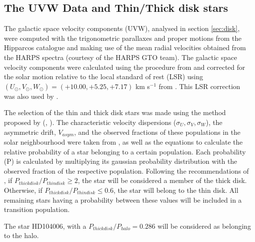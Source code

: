 \documentclass[oldversion]{aa}
\begin{document}
\subsection {The UVW Data and Thin/Thick disk stars}
\label{sec:uvwdata}

The galactic space velocity components (UVW), analysed in section \ref{sec:disk}, were computed with the trigonometric parallaxes and proper motions from the Hipparcos catalogue \citep{ESA-1997} and making use of the mean radial velocities obtained from the HARPS spectra (courtesy of the HARPS GTO team).  The galactic space velocity components were calculated using the procedure from \citet{Johnson-1987} and corrected for the solar motion relative to the local standard of rest (LSR) using $(U_\odot,V_\odot,W_\odot)=(+10.00,+5.25,+7.17)$ km s$^{-1}$ from \citet{Dehnen-1998}. This LSR correction was also used by \citet{Bensby-2003, Bensby-2005}.

The selection of the thin and thick disk stars was made using the method proposed by \citeauthor{Bensby-2003} (\citeyear{Bensby-2003}, \citeyear{Bensby-2005}). The characteristic velocity dispersions ($\sigma_U,\sigma_V, \sigma_W$), the asymmetric drift, $V_{asym}$, and the observed fractions of these populations in the solar neighbourhood were taken from \citet{Bensby-2005}, as well as the equations to calculate the relative probability of a star belonging to a certain population. Each probability (P) is calculated by multiplying its gaussian probability distribution with the observed fraction of the respective population. Following the recommendations of \citet{Bensby-2005}, if $P_{thick disk}/P_{thin disk}\geq2$, the star will be considered a member of the thick disk. Otherwise, if $P_{thick disk}/P_{thin disk}\leq0.6$,  the star will belong to the thin disk. All remaining stars having a probability between these values will be included in a transition population. 

The star HD104006, with a $P_{thick disk}/P_{halo}=0.286$ will be considered as belonging to the halo. %
\end{document}

